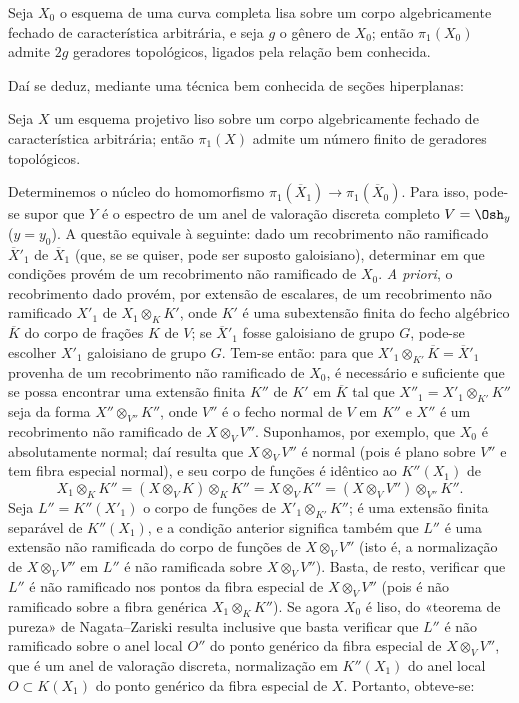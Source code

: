  Seja $X_0$ o esquema de uma curva completa lisa sobre
um corpo algebricamente fechado de característica arbitrária, e seja $g$ o
gênero de $X_0$; então $\pi_1(X_0)$ admite $2g$ geradores topológicos,
ligados pela relação bem conhecida.

Daí se deduz, mediante uma técnica bem conhecida de seções
hiperplanas:

 Seja $X$ um esquema projetivo liso sobre um corpo
algebricamente fechado de característica arbitrária; então $\pi_1(X)$
admite um número finito de geradores topológicos.

Determinemos o núcleo do homomorfismo
$\pi_1(\overline X_1)\longrightarrow\pi_1(\overline X_0)$. Para isso, pode-se
supor que $Y$ é o espectro de um anel de valoração discreta completo
$V=\Osh_y$ ($y=y_0$). A questão equivale à seguinte: dado um recobrimento
não ramificado $\overline X'_1$ de $\overline X_1$ (que, se se quiser, pode
ser suposto galoisiano), determinar em que condições provém de um
recobrimento não ramificado de $X_0$. \textit{A priori}, o recobrimento dado
provém, por extensão de escalares, de um recobrimento não ramificado $X'_1$
de $X_1\otimes_K K'$, onde $K'$ é uma subextensão finita do fecho
algébrico $\overline K$ do corpo de frações $K$ de $V$; se
$\overline X'_1$ fosse galoisiano de grupo $G$, pode-se escolher $X'_1$
galoisiano de grupo $G$. Tem-se então: para que
$X'_1\otimes_{K'}\overline K=\overline X'_1$ provenha de um recobrimento não
ramificado de $X_0$, é necessário e suficiente que se possa encontrar uma extensão
finita $K''$ de $K'$ em $\overline K$ tal que
$X''_1=X'_1\otimes_{K'}K''$ seja da forma $X''\otimes_{V''}K''$, onde $V''$
é o fecho normal de $V$ em $K''$ e $X''$ é um recobrimento não ramificado
de $X\otimes_VV''$. Suponhamos, por exemplo, que $X_0$ é absolutamente normal;
daí resulta que $X\otimes_VV''$ é normal (pois é plano sobre $V''$ e tem
fibra especial normal), e seu corpo de funções é idêntico ao $K''(X_1)$ de
\[
  X_1\otimes_KK''
  =(X\otimes_VK)\otimes_KK''
  =X\otimes_VK''
  =(X\otimes_VV'')\otimes_{V''}K''.
\]
Seja $L''=K''(X'_1)$ o corpo de funções de $X'_1\otimes_{K'}K''$; é uma
extensão finita separável de $K''(X_1)$, e a condição anterior significa
também que $L''$ é uma extensão não ramificada do corpo de funções de
$X\otimes_VV''$ (isto é, a normalização de $X\otimes_VV''$ em $L''$ é não
ramificada sobre $X\otimes_VV''$). Basta, de resto, verificar que $L''$ é
não ramificado nos pontos da fibra especial de $X\otimes_VV''$ (pois é não
ramificado sobre a fibra genérica $X_1\otimes_KK''$). Se agora $X_0$ é liso,
do «teorema de pureza» de Nagata--Zariski resulta inclusive que basta verificar
que $L''$ é não ramificado sobre o anel local $O''$ do ponto genérico da
fibra especial de $X\otimes_VV''$, que é um anel de valoração discreta,
normalização em $K''(X_1)$ do anel local $O\subset K(X_1)$ do ponto
genérico da fibra especial de $X$. Portanto, obteve-se:

